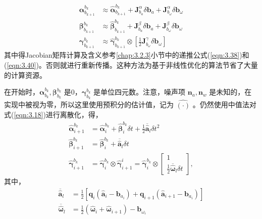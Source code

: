 \begin{equation}
\label{eqn:3.18}
\begin{aligned}
\bm{\alpha}_{b_{k+1}}^{b_{k}} & \approx \hat{\bm{\alpha}}_{b_{k+1}}^{b_{k}}+\bm{J}_{{b}_{a}}^{\alpha} \delta \mathbf{b}_{a}+\bm{J}_{{b}_{\omega}}^{\alpha} \delta \mathbf{b}_{\omega} \\  
\bm{\beta}_{b_{k+1}}^{b_{k}}  & \approx \hat{\bm{\beta}}_{b_{k+1}}^{b_{k}}+\bm{J}_{b_{a}}^{\beta} \delta \mathbf{b}_{a} + \bm{J}_{b_{\omega}}^{\beta} \delta \mathbf{b}_{\omega} \\
\bm{\gamma}_{b_{k+1}}^{b_{k}} & \approx \hat{\bm{\gamma}}_{b_{k+1}}^{b_{k}} \otimes\left[\frac{1}{2} \bm{J}_{b_{\omega}}^{\gamma} \delta \mathbf{b}_{\omega}\right]
\end{aligned}
\end{equation}
其中得Jacobian矩阵计算及含义参考\ref{chap:3.2.3}小节中的递推公式(\ref{eqn:3.38})和(\ref{eqn:3.40})。否则就进行重新传播。这种方法为基于非线性优化的算法节省了大量的计算资源。

在开始时，$\bm{\alpha}_{b_k}^{b_k},\bm{\beta}_{b_k}^{b_k} $ 是0，$\bm{\gamma}_{b_k}^{b_k} $ 是单位四元数。注意，噪声项 $\mathbf{n}_a,\mathbf{n}_w $ 是未知的，在实现中被视为零，所以这里使用预积分的估计值，记为 $\hat{(\cdot)} $ 。仍然使用中值法对式(\ref{eqn:3.18})进行离散化，得，
\begin{equation}
\label{eqn:3.19}
\begin{aligned}
\hat{\bm{\alpha}}_{i+1}^{b_{k}} &= \hat{\bm{\alpha}}_{i}^{b_{k}}+\hat{\bm{\beta}}_{i}^{b_{k}} \delta t+\frac{1}{2} \overline{\hat{\mathbf{a}}}_{l} \delta t^{2} \\
\hat{\bm{\beta}}_{i+1}^{b_{k}}  &= \hat{\bm{\beta}}_{i}^{b_{k}}+\overline{\hat{\mathbf{a}}}_{l} \delta t \\
\hat{\bm{\gamma}}_{i+1}^{b_{k}} &= \hat{\bm{\gamma}}_{i}^{b_{k}} \otimes \hat{\bm{\gamma}}_{i+1}^{i}=\hat{\bm{\gamma}}_{i}^{b_{k}} \otimes \begin{bmatrix} 1\\ \frac{1}{2} \overline{\hat{\bm{\omega}}}_{l} \delta t\end{bmatrix},
\end{aligned}
\end{equation}
其中，
\begin{equation}
\label{eqn:3.20}
\begin{aligned}
\overline{\hat{\mathbf{a}}}_{l} &= \frac{1}{2}\left[\mathbf{q}_{i}\left(\hat{ \mathbf{a}}_{i}-\mathbf{b}_{a_{i}}\right) +\mathbf{q}_{i+1}\left(\hat{\mathbf{a}}_{i+1}-\mathbf{b}_{a_{i}}\right) \right] \\ 
\overline{\hat{{\bm{\omega}}}}_{l}   &= \frac{1}{2}\left(\hat{\bm{\omega}}_{i}+\hat{\bm{\omega}}_{i+1}\right)-\mathbf{b}_{\omega_{i}}
\end{aligned}
\end{equation}

